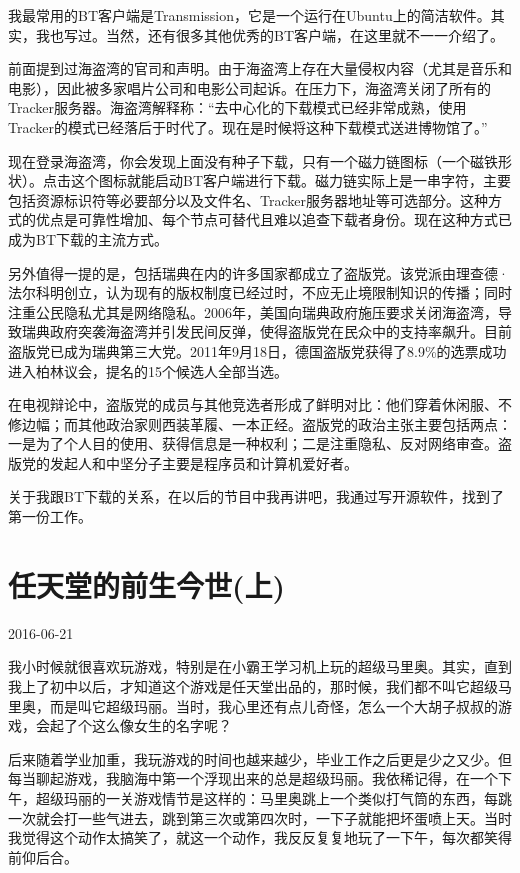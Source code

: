 \documentclass[
  letterpaper,
  DIV=11,
  numbers=noendperiod]{scrreprt}
\begin{document}
我最常用的BT客户端是Transmission，它是一个运行在Ubuntu上的简洁软件。其实，我也写过。当然，还有很多其他优秀的BT客户端，在这里就不一一介绍了。

前面提到过海盗湾的官司和声明。由于海盗湾上存在大量侵权内容（尤其是音乐和电影），因此被多家唱片公司和电影公司起诉。在压力下，海盗湾关闭了所有的Tracker服务器。海盗湾解释称：``去中心化的下载模式已经非常成熟，使用Tracker的模式已经落后于时代了。现在是时候将这种下载模式送进博物馆了。''

现在登录海盗湾，你会发现上面没有种子下载，只有一个磁力链图标（一个磁铁形状）。点击这个图标就能启动BT客户端进行下载。磁力链实际上是一串字符，主要包括资源标识符等必要部分以及文件名、Tracker服务器地址等可选部分。这种方式的优点是可靠性增加、每个节点可替代且难以追查下载者身份。现在这种方式已成为BT下载的主流方式。

另外值得一提的是，包括瑞典在内的许多国家都成立了盗版党。该党派由理查德·法尔科明创立，认为现有的版权制度已经过时，不应无止境限制知识的传播；同时注重公民隐私尤其是网络隐私。2006年，美国向瑞典政府施压要求关闭海盗湾，导致瑞典政府突袭海盗湾并引发民间反弹，使得盗版党在民众中的支持率飙升。目前盗版党已成为瑞典第三大党。2011年9月18日，德国盗版党获得了8.9\%的选票成功进入柏林议会，提名的15个候选人全部当选。

在电视辩论中，盗版党的成员与其他竞选者形成了鲜明对比：他们穿着休闲服、不修边幅；而其他政治家则西装革履、一本正经。盗版党的政治主张主要包括两点：一是为了个人目的使用、获得信息是一种权利；二是注重隐私、反对网络审查。盗版党的发起人和中坚分子主要是程序员和计算机爱好者。

关于我跟BT下载的关系，在以后的节目中我再讲吧，我通过写开源软件，找到了第一份工作。


\chapter{任天堂的前生今世(上)}\label{ux4efbux5929ux5802ux7684ux524dux751fux4ecaux4e16ux4e0a}

2016-06-21

我小时候就很喜欢玩游戏，特别是在小霸王学习机上玩的超级马里奥。其实，直到我上了初中以后，才知道这个游戏是任天堂出品的，那时候，我们都不叫它超级马里奥，而是叫它超级玛丽。当时，我心里还有点儿奇怪，怎么一个大胡子叔叔的游戏，会起了个这么像女生的名字呢？

后来随着学业加重，我玩游戏的时间也越来越少，毕业工作之后更是少之又少。但每当聊起游戏，我脑海中第一个浮现出来的总是超级玛丽。我依稀记得，在一个下午，超级玛丽的一关游戏情节是这样的：马里奥跳上一个类似打气筒的东西，每跳一次就会打一些气进去，跳到第三次或第四次时，一下子就能把坏蛋喷上天。当时我觉得这个动作太搞笑了，就这一个动作，我反反复复地玩了一下午，每次都笑得前仰后合。
\end{document}
